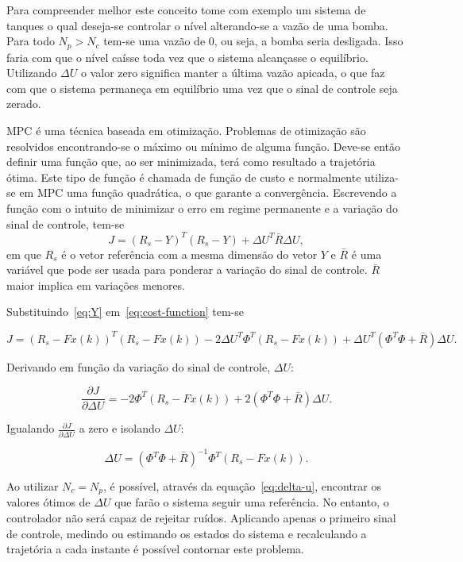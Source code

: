 Para compreender melhor este conceito tome com exemplo um sistema de tanques
o qual deseja-se controlar o nível alterando-se a vazão de uma bomba. Para todo
\( N_p > N_c \) tem-se uma vazão de 0, ou seja, a bomba seria desligada. Isso
faria com que o nível caísse toda vez que o sistema alcançasse o equilíbrio.
Utilizando \( \Delta{}U \) o valor zero significa manter a última vazão apicada,
o que faz com que o sistema permaneça em equilíbrio uma vez que o sinal de
controle seja zerado.

MPC é uma técnica baseada em otimização. Problemas de otimização são resolvidos
encontrando-se o máximo ou mínimo de alguma função. Deve-se então definir uma
função que, ao ser minimizada, terá como resultado a trajetória ótima. Este tipo
de função é chamada de função de custo e normalmente utiliza-se em \ac{MPC} uma
função quadrática, o que garante a convergência. Escrevendo a função com o
intuito de minimizar o erro em regime permanente e a variação do sinal de
controle, tem-se
%
\begin{equation}
	\label{eq:cost-function}
	J = {(R_s - Y)}^T(R_s-Y) + \Delta{}U^T\bar{R}\Delta{}U,
\end{equation}
%
em que \( R_s \) é o vetor referência com a mesma dimensão do vetor \( Y \) e
\(\bar{R} \) é uma variável que pode ser usada para ponderar a variação do sinal
de controle. \( \bar{R} \) maior implica em variações menores.

Substituindo~\eqref{eq:Y} em~\eqref{eq:cost-function} tem-se

\begin{equation}
	J = {(R_s-Fx(k))}^T(R_s-Fx(k))-2\Delta{}U^T\Phi^T(R_s-Fx(k))+\Delta{}U^T(\Phi^T\Phi+\bar{R})\Delta{}U.
\end{equation}

Derivando em função da variação do sinal de controle, \( \Delta{}U \):

\begin{equation}
	\frac{\partial{}J}{\partial{}\Delta{}U} = -2\Phi^T(R_s-Fx(k))+2(\Phi^T\Phi+\bar{R})\Delta{}U.
\end{equation}

Igualando \( \frac{\partial{}J}{\partial{}\Delta{}U} \) a zero e isolando \(
\Delta{}U \):

\begin{equation}
	\label{eq:delta-u}
	\Delta{}U = {(\Phi^T\Phi+\bar{R})}^{-1}\Phi^T(R_s-Fx(k)).
\end{equation}

Ao utilizar \( N_c = N_p \), é possível, através da equação~\eqref{eq:delta-u},
encontrar os valores ótimos de \( \Delta{}U \) que farão o sistema seguir uma
referência. No entanto, o controlador não será capaz de rejeitar ruídos.
Aplicando apenas o primeiro sinal de controle, medindo ou estimando os estados
do sistema e recalculando a trajetória a cada instante é possível contornar este
problema.


